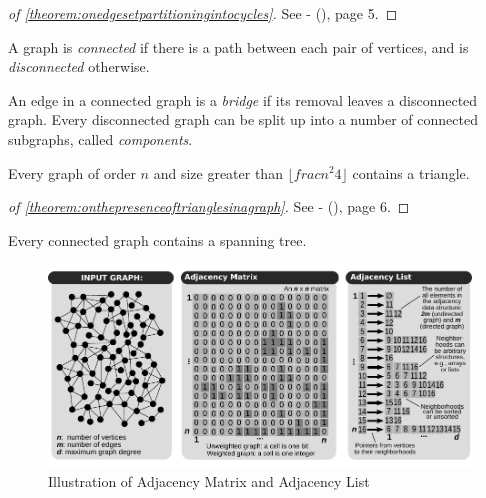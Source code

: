 \begin{proof}[of \autoref{theorem:onedgesetpartitioningintocycles}] \label{proof:onedgesetpartitioningintocycles}
	See  - \citeauthor{Bollobas1998} (\citeyear{Bollobas1998}), page 5.
\end{proof}

\begin{definition}\label{definition:ofconnectedgraphs}
	A graph is \textit{connected} if there is a path between each pair of vertices, and is \textit{disconnected} otherwise.
	
	An edge in a connected graph is a \textit{bridge} if its removal leaves a disconnected graph. Every disconnected graph can be split up into a number of connected subgraphs, called \textit{components}. 
\end{definition}

\begin{theorem} \label{theorem:onthepresenceoftrianglesinagraph}
	Every graph of order $ n $ and size greater than $ \lfloor frac{n^2}{4} \rfloor $ contains a triangle.
\end{theorem}

\begin{proof}[of \autoref{theorem:onthepresenceoftrianglesinagraph}] \label{proof:onthepresenceoftrianglesinagraph}
	See  - \citeauthor{Bollobas1998} (\citeyear{Bollobas1998}), page 6.
\end{proof}

\begin{corollary} \label{theorem:onspanningtreesofconnectedgraphs}
	Every connected graph contains a spanning tree.
\end{corollary}

\begin{figure}[H]%
	\centering%
	\includegraphics[width=1\textwidth,%
	]{images/chapter2/BestaPeterGerstenbergerFischerPodstawskiBarthelsAlonsoHoefler2019adjacencylistpage8.pdf}%
	\caption[Illustration of Adjacency Matrix and Adjacency List]{Illustration of Adjacency Matrix and Adjacency List}%
	\label{fig:BestaPeterGerstenbergerFischerPodstawskiBarthelsAlonsoHoefler2019adjacencylistpage8}%
\end{figure}%

